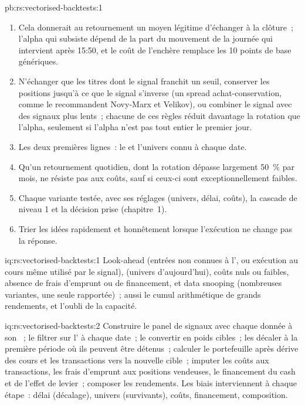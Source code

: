\begin{solution}{pb:rs:vectorised-backtests:1}
\begin{enumerate}
d'exécution à l'enchère, ou niveau~3), et sa réponse de niveau 1 est déjà négative.
\item Cela donnerait au retournement un moyen légitime d'échanger à la clôture~; l'alpha qui subsiste dépend de la part du mouvement de la journée qui intervient après
15:50, et le coût de l'enchère remplace les 10 points de base génériques.
\item N'échanger que les titres dont le signal franchit un seuil, conserver les positions jusqu'à ce que le signal s'inverse (un spread achat-conservation, comme le recommandent Novy-Marx et Velikov),
ou combiner le signal avec des signaux plus lents~; chacune de ces règles réduit davantage la rotation que l'alpha, seulement si l'alpha n'est pas tout entier le premier jour.
\item Les deux premières lignes~: le  et l'univers connu à chaque date.
\item Qu'un retournement quotidien, dont la rotation dépasse largement 50~\% par mois, ne résiste pas aux coûts, sauf si ceux-ci sont exceptionnellement faibles.
\item Chaque variante testée, avec ses réglages (univers, délai, coûts), la cascade de niveau 1 et la décision prise (chapitre~1).
\item Trier les idées rapidement et honnêtement lorsque l'exécution ne change pas la réponse.
\end{enumerate}
\end{solution}

\begin{solution}{iq:rs:vectorised-backtests:1}
Look-ahead (entrées non connues à l', ou exécution au cours même utilisé par le signal),  (univers d'aujourd'hui), coûts nuls ou faibles, absence de frais d'emprunt
ou de financement, et data snooping (nombreuses variantes, une seule rapportée)~; aussi le cumul arithmétique de grands rendements, et l'oubli de la capacité.
\end{solution}

\begin{solution}{iq:rs:vectorised-backtests:2}
Construire le panel de signaux avec chaque donnée à son ~; le filtrer sur l' à chaque date~; le convertir en poids cibles~; les décaler à la
première période où ils peuvent être détenus~; calculer le portefeuille après dérive des cours et les transactions vers la nouvelle cible~; imputer les coûts aux transactions, les frais d'emprunt aux positions vendeuses, le financement du cash et
de l'effet de levier~; composer les rendements. Les biais interviennent à chaque étape~: délai (décalage), univers (survivants), coûts, financement, composition.
\end{solution}

